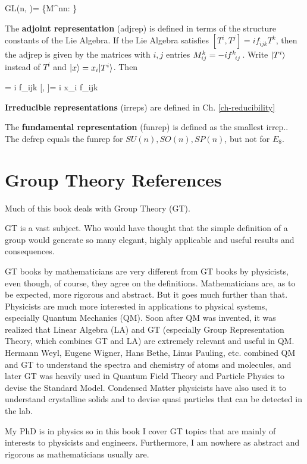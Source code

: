 \beq
GL(n, \CC)=
\{M\in \CC^{n\times n}: \}
\eeq

The {\bf adjoint representation} (adjrep)
is defined in terms of the structure constants
of the Lie Algebra. If the Lie Algebra satisfies
$[T^i, T^j]= if_{ijk}T^k$,
then the adjrep is given by the matrices 
with $i,j$ entries $M^k_{ij}=-if\indices{^k_i_j}$.
Write $|T^i\rangle$ instead of $T^i$
and  $|x\rangle = x_i |T^i\rangle$.
Then

   = i f_{ijk} \implies
{}[, \cdot]= 
i x_i f_{ijk}
\eeq


{\bf Irreducible representations} (irreps)
are defined in Ch. \ref{ch-reducibility}

The {\bf fundamental representation} (funrep)
is defined as the smallest irrep.. 
The defrep equals the funrep for
$SU(n), SO(n), SP(n)$, but not for $E_8$.



\section{Group Theory References}
Much of this book
deals with Group Theory (GT).


GT is a vast subject. Who would have thought
that the simple definition of 
a group would generate so many elegant, highly applicable and useful results and
consequences.

GT books by mathematicians are very
different from GT
books by physicists,
even though, of course,
they agree on the definitions. 
Mathematicians
are, as to be expected, more rigorous and abstract. But it goes much further than that. Physicists are much
more interested in applications
to physical systems,
especially Quantum Mechanics (QM).
Soon after QM was invented,
it was realized that Linear Algebra (LA) and GT  (especially Group Representation Theory,
which combines GT and LA)
are extremely
relevant and useful in QM.
Hermann Weyl,
Eugene Wigner, Hans Bethe, Linus Pauling, etc.
combined QM and GT to understand the spectra and chemistry of atoms and molecules,
and later GT was heavily used in Quantum Field Theory and Particle Physics to devise 
the Standard Model. Condensed Matter physicists have also used it to understand crystalline solids and to devise quasi particles that can be detected in the lab. 

My PhD is in physics
so in this book I cover 
GT topics that are  mainly of interests to
physicists and engineers. Furthermore,
I am nowhere as abstract and
rigorous as mathematicians 
usually are.

